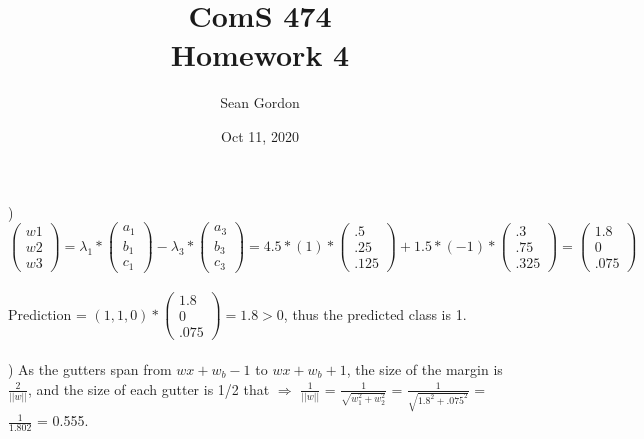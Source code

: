 \documentclass[12pt]{article}
\title{ComS 474\\Homework 4}
\author{Sean Gordon}
\date{Oct 11, 2020}
\begin{document}
\maketitle



) $
\begin{pmatrix}
w1\\ w2\\ w3
\end{pmatrix}
= \lambda_1 *
\begin{pmatrix}
a_1\\ b_1\\ c_1
\end{pmatrix}
- \lambda_3 *
\begin{pmatrix}
a_3\\ b_3\\ c_3
\end{pmatrix}
= 4.5 * (1) *
\begin{pmatrix}
.5\\ .25\\ .125
\end{pmatrix}
+ 1.5 * (-1) *
\begin{pmatrix}
.3\\ .75\\ .325
\end{pmatrix}
=
\begin{pmatrix}
1.8\\ 0\\ .075
\end{pmatrix}$\\\\

Prediction = $(1, 1, 0)*
\begin{pmatrix}
1.8\\ 0\\ .075
\end{pmatrix}
= 1.8 > 0$, thus the predicted class is 1.\\



\noindent \hrulefill \\



) As the gutters span from $wx+w_b-1$ to $wx+w_b+1$, the size of the margin is {\Large$\frac{2}{||w||}$}, and the size of each gutter is 1/2 that $\Rightarrow$ {\Large$\frac{1}{||w||}$} = {\Large$\frac{1}{\sqrt{w_1^2+w_2^2}}$} = {\Large$\frac{1}{\sqrt{1.8^2+.075^2}}$} = {\Large$\frac{1}{1.802}$} = 0.555.\\
\end{document}
